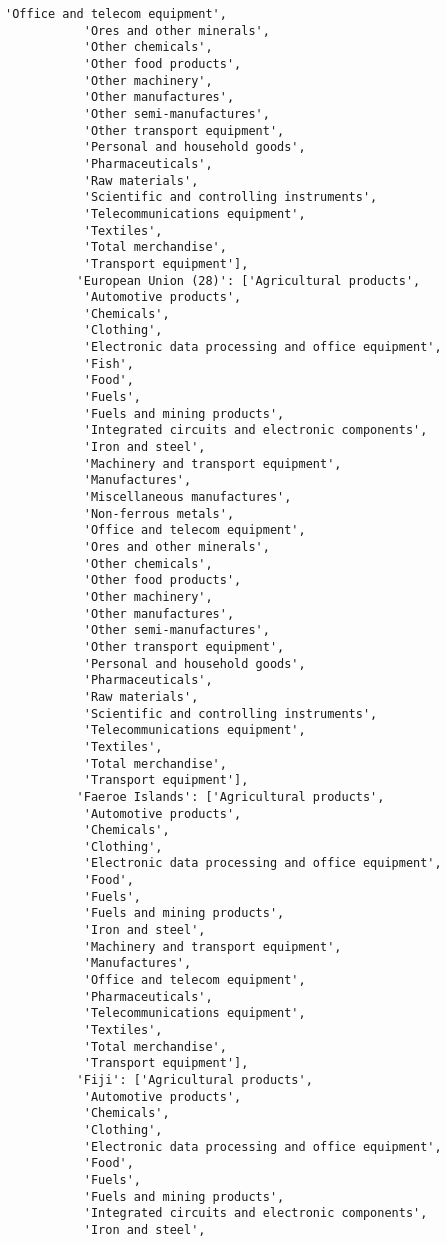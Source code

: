 \documentclass[11pt]{article}
\begin{document}
\begin{Verbatim}[commandchars=\\\{\}]
           'Office and telecom equipment',
           'Ores and other minerals',
           'Other chemicals',
           'Other food products',
           'Other machinery',
           'Other manufactures',
           'Other semi-manufactures',
           'Other transport equipment',
           'Personal and household goods',
           'Pharmaceuticals',
           'Raw materials',
           'Scientific and controlling instruments',
           'Telecommunications equipment',
           'Textiles',
           'Total merchandise',
           'Transport equipment'],
          'European Union (28)': ['Agricultural products',
           'Automotive products',
           'Chemicals',
           'Clothing',
           'Electronic data processing and office equipment',
           'Fish',
           'Food',
           'Fuels',
           'Fuels and mining products',
           'Integrated circuits and electronic components',
           'Iron and steel',
           'Machinery and transport equipment',
           'Manufactures',
           'Miscellaneous manufactures',
           'Non-ferrous metals',
           'Office and telecom equipment',
           'Ores and other minerals',
           'Other chemicals',
           'Other food products',
           'Other machinery',
           'Other manufactures',
           'Other semi-manufactures',
           'Other transport equipment',
           'Personal and household goods',
           'Pharmaceuticals',
           'Raw materials',
           'Scientific and controlling instruments',
           'Telecommunications equipment',
           'Textiles',
           'Total merchandise',
           'Transport equipment'],
          'Faeroe Islands': ['Agricultural products',
           'Automotive products',
           'Chemicals',
           'Clothing',
           'Electronic data processing and office equipment',
           'Food',
           'Fuels',
           'Fuels and mining products',
           'Iron and steel',
           'Machinery and transport equipment',
           'Manufactures',
           'Office and telecom equipment',
           'Pharmaceuticals',
           'Telecommunications equipment',
           'Textiles',
           'Total merchandise',
           'Transport equipment'],
          'Fiji': ['Agricultural products',
           'Automotive products',
           'Chemicals',
           'Clothing',
           'Electronic data processing and office equipment',
           'Food',
           'Fuels',
           'Fuels and mining products',
           'Integrated circuits and electronic components',
           'Iron and steel',

\end{Verbatim}
\end{document}
